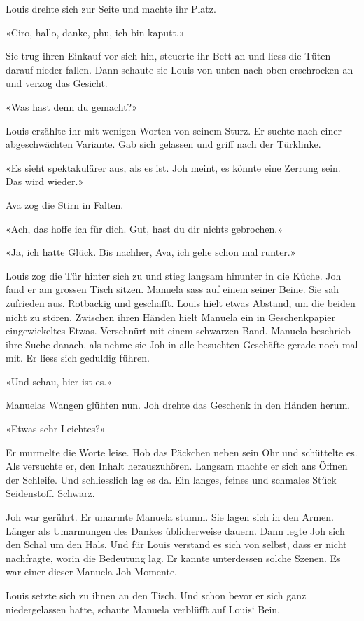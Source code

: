 Louis drehte sich zur Seite und machte ihr Platz.

«Ciro, hallo, danke, phu, ich bin kaputt.»

Sie trug ihren Einkauf vor sich hin, steuerte ihr Bett an und liess die
Tüten darauf nieder fallen. Dann schaute sie Louis von unten nach oben
erschrocken an und verzog das Gesicht.

«Was hast denn du gemacht?»

Louis erzählte ihr mit wenigen Worten von seinem Sturz. Er suchte nach
einer abgeschwächten Variante. Gab sich gelassen und griff nach der
Türklinke.

«Es sieht spektakulärer aus, als es ist. Joh meint, es könnte eine
Zerrung sein. Das wird wieder.»

Ava zog die Stirn in Falten.

«Ach, das hoffe ich für dich. Gut, hast du dir nichts gebrochen.»

«Ja, ich hatte Glück. Bis nachher, Ava, ich gehe schon mal runter.»

Louis zog die Tür hinter sich zu und stieg langsam hinunter in die
Küche. Joh fand er am grossen Tisch sitzen. Manuela sass auf einem
seiner Beine. Sie sah zufrieden aus. Rotbackig und geschafft. Louis
hielt etwas Abstand, um die beiden nicht zu stören. Zwischen ihren
Händen hielt Manuela ein in Geschenkpapier eingewickeltes Etwas.
Verschnürt mit einem schwarzen Band. Manuela beschrieb ihre Suche
danach, als nehme sie Joh in alle besuchten Geschäfte gerade noch mal
mit. Er liess sich geduldig führen.

«Und schau, hier ist es.»

Manuelas Wangen glühten nun. Joh drehte das Geschenk in den Händen
herum.

«Etwas sehr Leichtes?»

Er murmelte die Worte leise. Hob das Päckchen neben sein Ohr und
schüttelte es. Als versuchte er, den Inhalt herauszuhören. Langsam
machte er sich ans Öffnen der Schleife. Und schliesslich lag es da. Ein
langes, feines und schmales Stück Seidenstoff. Schwarz.

Joh war gerührt. Er umarmte Manuela stumm. Sie lagen sich in den Armen.
Länger als Umarmungen des Dankes üblicherweise dauern. Dann legte Joh
sich den Schal um den Hals. Und für Louis verstand es sich von selbst,
dass er nicht nachfragte, worin die Bedeutung lag. Er kannte unterdessen
solche Szenen. Es war einer dieser Manuela-Joh-Momente.

Louis setzte sich zu ihnen an den Tisch. Und schon bevor er sich ganz
niedergelassen hatte, schaute Manuela verblüfft auf Louis` Bein.

